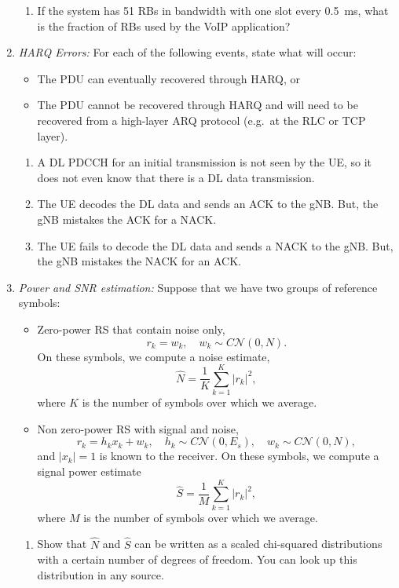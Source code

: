 \documentclass[11pt]{article}
\begin{document}
\begin{enumerate}
\begin{enumerate}[label=(\alph*)]
\item If the system has 51 RBs in bandwidth with one slot every \SI{0.5}{ms}, what is the fraction
of RBs used by the VoIP application?
\end{enumerate}


\item \emph{HARQ Errors:}  For each of the following events, state what will occur:
\begin{itemize}
\item The PDU can eventually recovered through HARQ, or
\item The PDU cannot be recovered through HARQ and will need to be recovered from
a high-layer ARQ protocol (e.g.\ at the RLC or TCP layer).
\end{itemize}
\begin{enumerate}[label=(\alph*)]
\item A DL PDCCH for an initial transmission is not seen by the UE, so it does not even
know that there is a DL data transmission.

\item The UE decodes the DL data and sends an ACK to the gNB.  But, the gNB mistakes the
ACK for a NACK.

\item The UE fails to decode the DL data and sends a NACK to the gNB.  But, the gNB mistakes the
NACK for an ACK.

\end{enumerate}


\item \emph{Power and SNR estimation:}  Suppose that
we have two groups of reference symbols:
\begin{itemize}
\item Zero-power RS that contain noise only,
\[
    r_k = w_k, \quad w_k \sim C{\mathcal N}(0,N).
\]
On these symbols, we compute a noise estimate,
\[
    \widehat{N} = \frac{1}{K} \sum_{k=1}^K |r_k|^2,
\]
where $K$ is the number of symbols over which we average.


\item Non zero-power RS with signal and noise,
\[
    r_k = h_kx_k + w_k, \quad
    h_k \sim C{\mathcal N}(0,E_s), \quad
    w_k \sim C{\mathcal N}(0,N),
\]
and $|x_k|=1$ is known to the receiver.
On these symbols, we compute a signal power estimate
\[
    \widehat{S} = \frac{1}{M} \sum_{k=1}^K |r_k|^2,
\]
where $M$ is the number of symbols over which we average.
\end{itemize}

\begin{enumerate}[label=(\alph*)]
\item Show that  $\widehat{N}$ and $\widehat{S}$
can be written as a scaled chi-squared
distributions with a certain number of degrees of freedom.
You can look up this distribution in any source.


\end{enumerate}
\end{enumerate}
\end{document}
